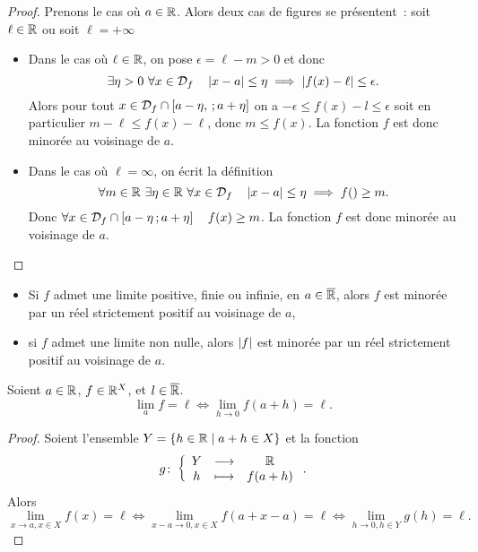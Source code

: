 \begin{proof}
  Prenons le cas où $a \in \mathbb{R}$. Alors deux cas de figures se présentent~: soit $\ell \in \mathbb{R}$ ou soit $\ell = + \infty$
  \begin{itemize}
  \item Dans le cas où $\ell \in \mathbb{R}$, on pose $\epsilon = \ell-m >0$ et donc
    \begin{equation}
      \exists \eta > 0 \ \forall x \in \mathcal{D}_{f} \quad \left\lvert x-a\right\rvert \leq \eta \implies \left\lvert f(x)-\ell\right\rvert \leq \epsilon.
    \end{equation}
    Alors pour tout $x \in \mathcal{D}_{f} \cap \left[ a-\eta, \, ;  a+\eta \right]$ on a $-\epsilon \leq f(x)-l \leq \epsilon$ soit en particulier $m-\ell \leq f(x)-\ell$, donc $m \leq f(x)$. La fonction $f$ est donc minorée au voisinage de $a$.
  \item Dans le cas où $\ell=\infty$, on écrit la définition
    \begin{equation}
      \forall m \in \R \ \exists \eta \in \R \ \forall x \in \Def{f} \quad \abs{x-a} \leq \eta \implies f() \geq m.
    \end{equation}
    Donc $\forall x \in \mathcal{D}_{f} \cap \left[ a-\eta \, ;  a+\eta \right] \quad f(x) \geq m$. La fonction $f$ est donc minorée au voisinage de $a$.
  \end{itemize}
\end{proof}
\begin{cor}
  \begin{itemize}
  \item Si $f$ admet une limite positive, finie ou infinie, en $a \in \overline{\mathbb{R}}$, alors $f$ est minorée par un réel strictement positif au voisinage de $a$,
  \item si $f$ admet une limite non nulle, alors $\left\lvert f\right\rvert$ est minorée par un réel strictement positif au voisinage de $a$.
  \end{itemize}
\end{cor}
\begin{prop}
  Soient $a \in \mathbb{R}$, $f\in \mathbb{R}^X$, et $l \in \overline{\mathbb{R}}$.
  \begin{equation}
    \lim\limits_{a}f=\ell \iff \lim\limits_{h \to 0} f(a+h)=\ell.
  \end{equation}
\end{prop}
\begin{proof}
  Soient l'ensemble $Y=\left\{h \in \mathbb{R}\mathrel{}\middle|\mathrel{}a+h \in X\right\}$ et la fonction
  \begin{equation}
    g\colon \left\{\begin{array}{ccc} Y & \longrightarrow &\mathbb{R}\\ h & \longmapsto & f(a+h) \end{array} \right..
  \end{equation}
  Alors
  \begin{equation}
    \lim\limits_{x \to a, x \in X}f(x)=\ell \iff \lim\limits_{x-a \to 0, x \in X}f(a+x-a)=\ell \iff \lim\limits_{h \to 0, h \in Y}g(h)=\ell.
  \end{equation}
\end{proof}

